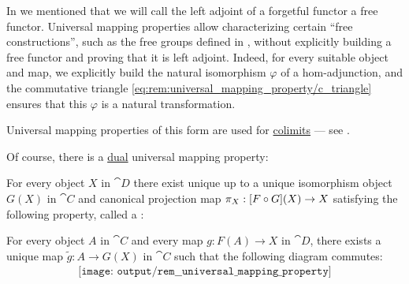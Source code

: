 \begin{remark}
  In  we mentioned that we will call the left adjoint of a forgetful functor a free functor. Universal mapping properties allow characterizing certain \enquote{free constructions}, such as the free groups defined in , without explicitly building a free functor and proving that it is left adjoint. Indeed, for every suitable object and map, we explicitly build the natural isomorphism \( \varphi \) of a hom-adjunction, and the commutative triangle \eqref{eq:rem:universal_mapping_property/c_triangle} ensures that this \( \varphi \) is a natural transformation.

  Universal mapping properties of this form are used for \hyperref[def:category_of_cones/colimit]{colimits} --- see .

  Of course, there is a \hyperref[thm:categorical_principle_of_duality]{dual} universal mapping property:
  \begin{displayquote}
    For every object \( X \) in \( \cat{D} \) there exist unique up to a unique isomorphism object \( G(X) \) in \( \cat{C} \) and canonical projection map \( \pi_X: [F \bincirc G](X) \to X \) satisfying the following property, called a :
    \begin{displayquote}
      For every object \( A \) in \( \cat{C} \) and every map \( g: F(A) \to X \) in \( \cat{D} \), there exists a unique map \( \widetilde{g}: A \to G(X) \) in \( \cat{C} \) such that the following diagram commutes:
      \begin{equation}\label{eq:rem:universal_mapping_property/d_triangle}
        \begin{aligned}
          \texttt{[image: output/rem\_\_universal\_mapping\_property]}
        \end{aligned}
      \end{equation}
    \end{displayquote}
  \end{displayquote}


\end{remark}
